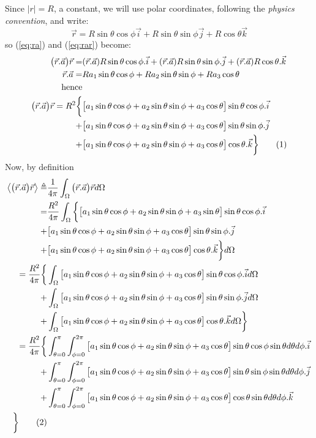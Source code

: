 \documentclass[]{article}
\newcommand\numberthis{\addtocounter{equation}{1}\tag{\theequation}}
\begin{document}
Since $|r|=R$, a constant, we will use polar coordinates, following the \emph{physics convention}\cite{wiki-polar}, and write:
$$\vec{r}=R\sin\theta\cos\phi\vec{i}+R\sin\theta\sin\phi\vec{j}+R\cos\theta\vec{k}$$
so (\ref{eq:ra}) and (\ref{eq:rar}) become:
\begin{align*}
\big(\vec{r}.\vec{a}\big)\vec{r} =& (\vec{r}.\vec{a}) R \sin\theta\cos\phi .\vec{i} + (\vec{r}.\vec{a})R\sin\theta\sin\phi . \vec{j} + (\vec{r}.\vec{a}) R\cos\theta. \vec{k}\\
\vec{r}.\vec{a} =& Ra_1\sin\theta\cos\phi + Ra_2\sin\theta\sin\phi + Ra_3 \cos\theta\\
\text{hence}&\\
\big(\vec{r}.\vec{a}\big)\vec{r} = R^2 \bigg\{& \big[a_1\sin\theta\cos\phi + a_2\sin\theta\sin\phi + a_3 \cos\theta\big] \sin\theta\cos\phi.\vec{i}\\ +& \big[a_1\sin\theta\cos\phi + a_2\sin\theta\sin\phi + a_3 \cos\theta\big]\sin\theta\sin\phi. \vec{j}\\
 +& \big[a_1\sin\theta\cos\phi + a_2\sin\theta\sin\phi + a_3 \cos\theta\big] \cos\theta. \vec{k}\bigg\}\numberthis \label{eq:rar_expanded}
\end{align*}
Now, by definition
\begin{align*}
\left\langle \big(\vec{r}.\vec{a}\big)\vec{r} \right\rangle \triangleq& \frac{1}{4\pi}\int_{\Omega}\big(\vec{r}.\vec{a}\big)\vec{r} d\Omega \\
=&  \frac{ R^2}{4\pi}\int_{\Omega} \bigg\{ \big[a_1\sin\theta\cos\phi + a_2\sin\theta\sin\phi + a_3 \sin\theta\big] \sin\theta\cos\phi.\vec{i}\\ +& \big[a_1\sin\theta\cos\phi + a_2\sin\theta\sin\phi + a_3 \cos\theta\big]\sin\theta\sin\phi .\vec{j}\\
+& \big[a_1\sin\theta\cos\phi + a_2\sin\theta\sin\phi + a_3 \cos\theta\big] \cos\theta. \vec{k}\bigg\}d\Omega\\
= \frac{ R^2}{4\pi} \bigg\{&\int_{\Omega}\big[a_1\sin\theta\cos\phi + a_2\sin\theta\sin\phi + a_3 \cos\theta\big] \sin\theta\cos\phi.\vec{i}d\Omega\\ +& \int_{\Omega}\big[a_1\sin\theta\cos\phi + a_2\sin\theta\sin\phi + a_3 \cos\theta\big]\sin\theta\sin\phi .\vec{j}d\Omega\\
+& \int_{\Omega}\big[a_1\sin\theta\cos\phi + a_2\sin\theta\sin\phi + a_3 \cos\theta\big] \cos\theta. \vec{k} d\Omega\bigg\}\\
= \frac{ R^2}{4\pi} \bigg\{&\int_{\theta=0}^{\pi}\int_{\phi=0}^{2\pi}\big[a_1\sin\theta\cos\phi + a_2\sin\theta\sin\phi + a_3 \cos\theta\big] \sin\theta\cos\phi\sin\theta d\theta d\phi.\vec{i}\\
 +& \int_{\theta=0}^{\pi}\int_{\phi=0}^{2\pi}\big[a_1\sin\theta\cos\phi + a_2\sin\theta\sin\phi + a_3 \cos\theta\big]\sin\theta\sin\phi \sin\theta d\theta d\phi.\vec{j}\\
+& \int_{\theta=0}^{\pi}\int_{\phi=0}^{2\pi}\big[a_1\sin\theta\cos\phi + a_2\sin\theta\sin\phi + a_3 \cos\theta\big] \cos\theta \sin\theta d\theta d\phi.\vec{k}\\ \bigg\} \numberthis \label{eq:big-int}
\end{align*}
\end{document}
